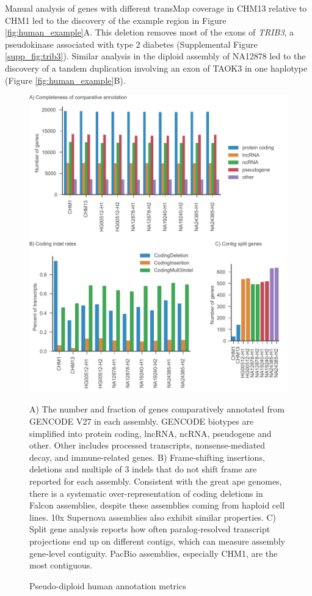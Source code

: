 \documentclass[fleqn,10pt]{wlscirep}
\begin{document}
Manual analysis of genes with different transMap coverage in CHM13 relative to CHM1 led to the discovery of the example region in Figure \ref{fig:human_example}A. This deletion removes most of the exons of \textit{TRIB3}, a pseudokinase associated with type 2 diabetes  \citep{shi2009association} (Supplemental Figure \ref{supp_fig:trib3}). Similar analysis in the diploid assembly of NA12878 led to the discovery of a tandem duplication involving an exon of TAOK3 in one haplotype (Figure \ref{fig:human_example}B).

\begin{figure}
\centering
\includegraphics[width=\textwidth,height=0.75\textheight,keepaspectratio]{human-metrics.pdf}
\caption{Pseudo-diploid human annotation metrics}
A) The number and fraction of genes comparatively annotated from GENCODE V27 in each assembly. GENCODE biotypes are simplified into protein coding, lncRNA, ncRNA, pseudogene and other. Other includes processed transcripts, nonsense-mediated decay, and immune-related genes. B) Frame-shifting insertions, deletions and multiple of 3 indels that do not shift frame are reported for each assembly. Consistent with the great ape genomes, there is a systematic over-representation of coding deletions in Falcon assemblies, despite these assemblies coming from haploid cell lines. 10x Supernova assemblies also exhibit similar properties. C) Split gene analysis reports how often paralog-resolved transcript projections end up on different contigs, which can measure assembly gene-level contiguity. PacBio assemblies, especially CHM1, are the most contiguous.
\label{fig:human_metrics}
\end{figure}
\end{document}
